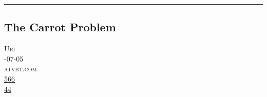 \documentclass[10pt,a4paper]{article}
\begin{document}
\par\medskip
\noindent\textcolor{red}{\rule{\linewidth}{0.2mm}}

\subsection{The Carrot Problem}
\noindent\begin{minipage}[t]{0.20\linewidth}
\vspace{0pt}
\noindent\textsc{\footnotesize
{\scriptsize\faUser}\space 
Uri \\
{\scriptsize\faCalendar}-07-05 \\
{\scriptsize\faGlobe}\space 
atvbt.com \\
{\scriptsize\faThumbsOUp}\space 
\href{http://news.ycombinator.com/item?id=37100226\&utm\_term=comment}{566} \\
{\scriptsize\faComments}\space 
\href{http://news.ycombinator.com/item?id=37100226\&utm\_term=comment}{44} \\
}
\end{minipage} %
\end{document}
